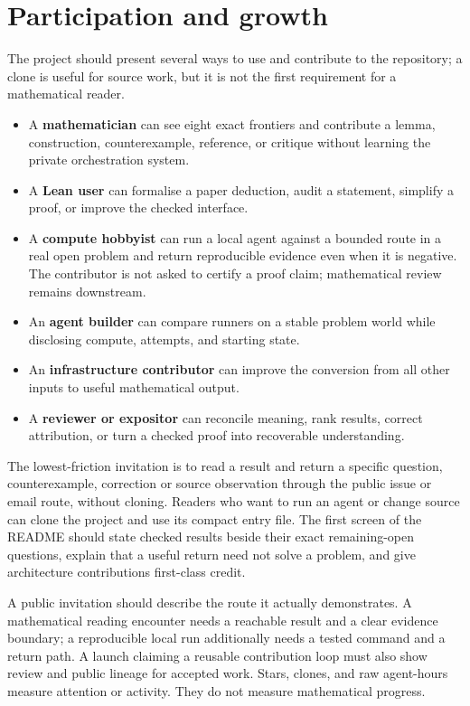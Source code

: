 \documentclass[10pt]{article}
\begin{document}
\section{Participation and growth}\label{sec:growth}

The project should present several ways to use and contribute to the
repository; a clone is useful for source work, but it is not the first
requirement for a mathematical reader.

\begin{itemize}
\item A \textbf{mathematician} can see eight exact frontiers and contribute a
      lemma, construction, counterexample, reference, or critique without
      learning the private orchestration system.
\item A \textbf{Lean user} can formalise a paper deduction, audit a statement,
      simplify a proof, or improve the checked interface.
\item A \textbf{compute hobbyist} can run a local agent against a bounded route
      in a real open problem and return reproducible evidence even when it is
      negative.  The contributor is not asked to certify a proof claim;
      mathematical review remains downstream.
\item An \textbf{agent builder} can compare runners on a stable problem world
      while disclosing compute, attempts, and starting state.
\item An \textbf{infrastructure contributor} can improve the conversion from
      all other inputs to useful mathematical output.
\item A \textbf{reviewer or expositor} can reconcile meaning, rank results,
      correct attribution, or turn a checked proof into recoverable
      understanding.
\end{itemize}

The lowest-friction invitation is to read a result and return a specific
question, counterexample, correction or source observation through the public
issue or email route, without cloning. Readers who want to run an agent or
change source can clone the project and use its compact entry file. The first
screen of the README should state checked results beside their exact
remaining-open questions, explain that a useful return need not solve a
problem, and give architecture contributions first-class credit.

A public invitation should describe the route it actually demonstrates. A
mathematical reading encounter needs a reachable result and a clear evidence
boundary; a reproducible local run additionally needs a tested command and a
return path. A launch claiming a reusable contribution loop must also show
review and public lineage for accepted work. Stars, clones, and raw
agent-hours measure attention or activity. They do not measure mathematical
progress.
\end{document}
